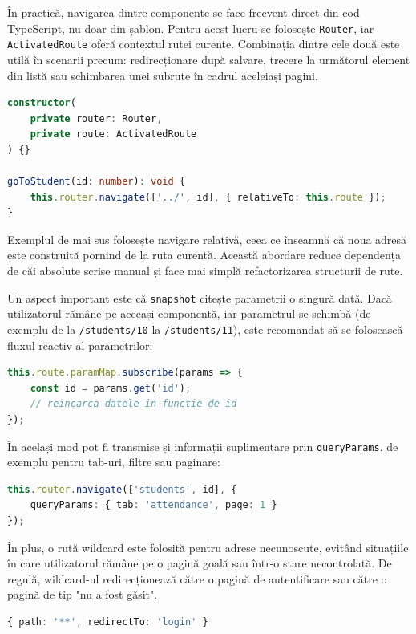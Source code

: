 În practică, navigarea dintre componente se face frecvent direct din cod TypeScript, nu doar din șablon. Pentru acest lucru se folosește \texttt{Router}, iar \texttt{ActivatedRoute} oferă contextul rutei curente. Combinația dintre cele două este utilă în scenarii precum: redirecționare după salvare, trecere la următorul element din listă sau schimbarea unei subrute în cadrul aceleiași pagini.

\begin{lstlisting}[language=TypeScript]
constructor(
	private router: Router,
	private route: ActivatedRoute
) {}

goToStudent(id: number): void {
	this.router.navigate(['../', id], { relativeTo: this.route });
}
\end{lstlisting}

Exemplul de mai sus folosește navigare relativă, ceea ce înseamnă că noua adresă este construită pornind de la ruta curentă. Această abordare reduce dependența de căi absolute scrise manual și face mai simplă refactorizarea structurii de rute.

Un aspect important este că \texttt{snapshot} citește parametrii o singură dată. Dacă utilizatorul rămâne pe aceeași componentă, iar parametrul se schimbă (de exemplu de la \texttt{/students/10} la \texttt{/students/11}), este recomandat să se folosească fluxul reactiv al parametrilor:

\begin{lstlisting}[language=TypeScript]
this.route.paramMap.subscribe(params => {
	const id = params.get('id');
	// reincarca datele in functie de id
});
\end{lstlisting}

În același mod pot fi transmise și informații suplimentare prin \texttt{queryParams}, de exemplu pentru tab-uri, filtre sau paginare:

\begin{lstlisting}[language=TypeScript]
this.router.navigate(['students', id], {
	queryParams: { tab: 'attendance', page: 1 }
});
\end{lstlisting}

În plus, o rută wildcard este folosită pentru adrese necunoscute, evitând situațiile în care utilizatorul rămâne pe o pagină goală sau într-o stare necontrolată. De regulă, wildcard-ul redirecționează către o pagină de autentificare sau către o pagină de tip "nu a fost găsit".

\begin{lstlisting}[language=TypeScript]
{ path: '**', redirectTo: 'login' }
\end{lstlisting}

